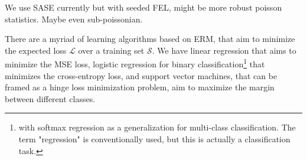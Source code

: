 We use SASE currently but with seeded FEL, might be more robust poisson statistics. Maybe even sub-poissonian. 

There are a myriad of learning algorithms based on \gls{ERM}, that aim to minimize the expected loss $\mathcal{L}$ over a training set $\mathcal{S}$.  We have linear regression that aims to minimize the \gls{MSE} loss, logistic regression for binary classification\footnote{with softmax regression as a generalization for multi-class classification. The term "regression" is conventionally used, but this is actually a classification task.} that minimizes the cross-entropy loss, and support vector machines, that can be framed as a hinge loss minimization problem, aim to maximize the margin between different classes.
